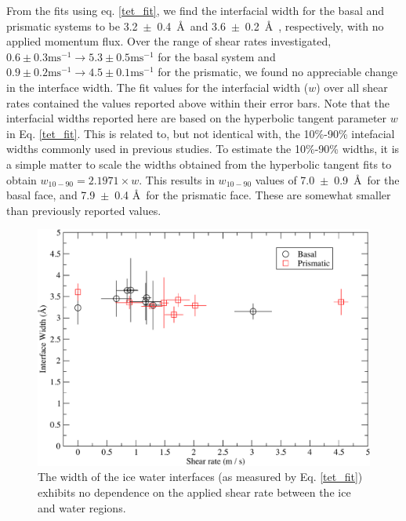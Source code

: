 From the fits using eq. \eqref{tet_fit}, we find the interfacial width
for the basal and prismatic systems to be 3.2~$\pm$~0.4~\AA\ and
3.6~$\pm$~0.2~\AA\ , respectively, with no applied momentum flux. Over
the range of shear rates investigated, $0.6 \pm 0.3 \mathrm{ms}^{-1}
\rightarrow 5.3 \pm 0.5 \mathrm{ms}^{-1}$ for the basal system and
$0.9 \pm 0.2 \mathrm{ms}^{-1} \rightarrow 4.5 \pm 0.1
\mathrm{ms}^{-1}$ for the prismatic, we found no appreciable change in
the interface width. The fit values for the interfacial width ($w$)
over all shear rates contained the values reported above within their
error bars.  Note that the interfacial widths reported here are based
on the hyperbolic tangent parameter $w$ in Eq. \ref{tet_fit}.  This is
related to, but not identical with, the 10\%-90\% intefacial widths
commonly used in previous studies.\cite{Bryk02,Bryk2004b} To estimate
the 10\%-90\% widths, it is a simple matter to scale the widths
obtained from the hyperbolic tangent fits to obtain $w_{10-90} =
2.1971 \times w$.\cite{Bryk02,Bryk2004b} This results in $w_{10-90}$
values of 7.0~$\pm$~0.9~\AA\ for the basal face, and 7.9~$\pm$~0.4
\AA\ for the prismatic face.  These are somewhat smaller than
previously reported values.

\begin{figure}
\includegraphics[width=\linewidth]{Figures/interface_width_by_shear_rate}
\caption{\label{fig:widthByShear} The width of the ice water
  interfaces (as measured by Eq. \ref{tet_fit}) exhibits no dependence
  on the applied shear rate between the ice and water regions.}
\end{figure}



